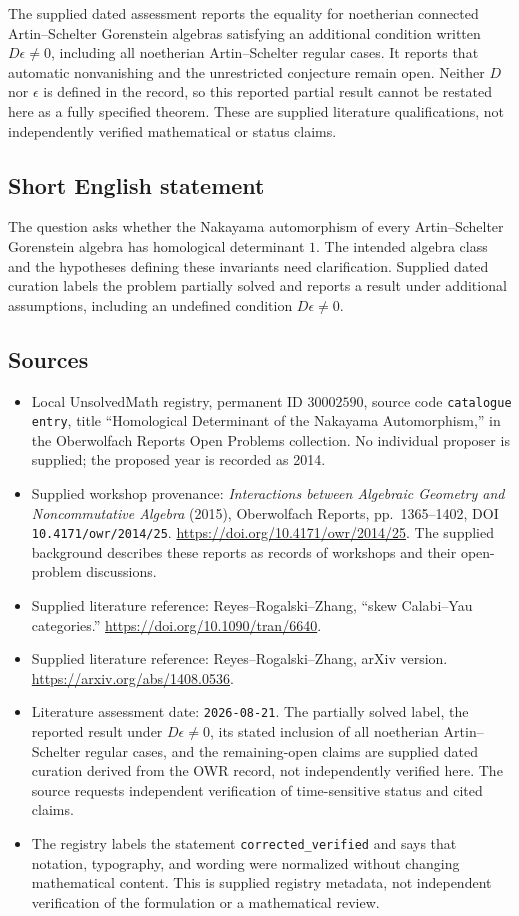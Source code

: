 \documentclass[11pt]{article}
\begin{document}
The supplied dated assessment reports the equality for noetherian connected Artin--Schelter Gorenstein algebras satisfying an additional condition written \(D\epsilon\ne0\), including all noetherian Artin--Schelter regular cases. It reports that automatic nonvanishing and the unrestricted conjecture remain open. Neither \(D\) nor \(\epsilon\) is defined in the record, so this reported partial result cannot be restated here as a fully specified theorem. These are supplied literature qualifications, not independently verified mathematical or status claims.
\subsection{Short English statement}
The question asks whether the Nakayama automorphism of every Artin--Schelter Gorenstein algebra has homological determinant \(1\). The intended algebra class and the hypotheses defining these invariants need clarification. Supplied dated curation labels the problem partially solved and reports a result under additional assumptions, including an undefined condition \(D\epsilon\ne0\).
\subsection{Sources}
\begin{itemize}
\item Local UnsolvedMath registry, permanent ID \(30002590\), source code \texttt{catalogue entry}, title ``Homological Determinant of the Nakayama Automorphism,'' in the Oberwolfach Reports Open Problems collection. No individual proposer is supplied; the proposed year is recorded as 2014.
\item Supplied workshop provenance: \emph{Interactions between Algebraic Geometry and Noncommutative Algebra} (2015), Oberwolfach Reports, pp.\ 1365--1402, DOI \texttt{10.4171/owr/2014/25}. \url{https://doi.org/10.4171/owr/2014/25}. The supplied background describes these reports as records of workshops and their open-problem discussions.
\item Supplied literature reference: Reyes--Rogalski--Zhang, ``skew Calabi--Yau categories.'' \url{https://doi.org/10.1090/tran/6640}.
\item Supplied literature reference: Reyes--Rogalski--Zhang, arXiv version. \url{https://arxiv.org/abs/1408.0536}.
\item Literature assessment date: \texttt{2026-08-21}. The partially solved label, the reported result under \(D\epsilon\ne0\), its stated inclusion of all noetherian Artin--Schelter regular cases, and the remaining-open claims are supplied dated curation derived from the OWR record, not independently verified here. The source requests independent verification of time-sensitive status and cited claims.
\item The registry labels the statement \texttt{corrected\_verified} and says that notation, typography, and wording were normalized without changing mathematical content. This is supplied registry metadata, not independent verification of the formulation or a mathematical review.
\end{itemize}
\end{document}
